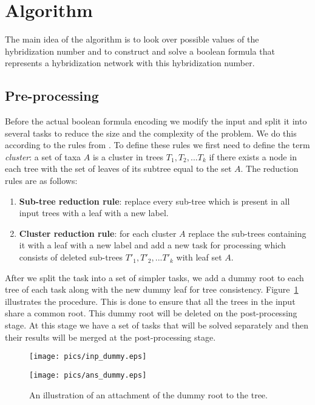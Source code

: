 \documentclass[runningheads, envcountsame, a4paper]{llncs}
\begin{document}
\section{Algorithm}

The main idea of the algorithm is to look over possible values of the hybridization number and to construct and solve a boolean 
formula that represents a hybridization network with this hybridization number.

\subsection{Pre-processing}

Before the actual boolean formula encoding we modify the input and split it into several tasks to reduce the size 
and the complexity of the problem. We do this according to the rules from \cite {bonet2009efficiently}. To define these 
rules we first need to define the term \emph{cluster}: a set of taxa $A$ is a cluster in trees $T_1, T_2, ... T_k$ if there 
exists a node in each tree with the set of leaves of its subtree equal to the set $A$. The reduction rules are as follows:

\begin{enumerate}

\item \textbf{Sub-tree reduction rule}:
replace every sub-tree which is present in all input trees with a leaf with a new label.

\item \textbf{Cluster reduction rule}:
for each cluster $A$ replace the sub-trees containing it with a leaf with a new label and add a new task for processing 
which consists of deleted sub-trees $T'_1, T'_2, ... T'_k$ with leaf set $A$.

\end{enumerate}

After we split the task into a set of simpler tasks, we add a dummy root to each tree of each task along with 
the new dummy leaf for tree consistency. Figure~\ref{dummy-example} illustrates the procedure. 
This is done to ensure that all the trees in the input share a common root. 
This dummy root will be deleted on the post-processing stage. At this stage we have a set of tasks that will be solved 
separately and then their results will be merged at the post-processing stage.

\begin{figure}[t]
  \centering
  \begin{minipage}[b]{0.39\linewidth}
    \texttt{[image: pics/inp\_dummy.eps]}
  \end{minipage}
  \hfill
  \begin{minipage}[b]{0.59\linewidth}
    \texttt{[image: pics/ans\_dummy.eps]}
  \end{minipage}
  \caption{An illustration of an attachment of the dummy root to the tree.}
  \label{dummy-example}
\end{figure}
\end{document}
